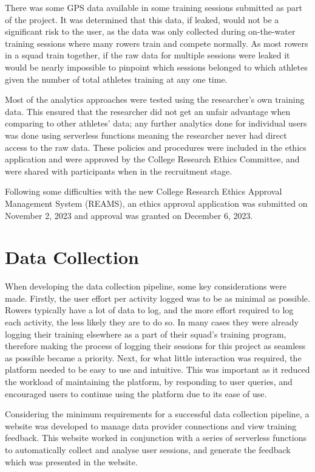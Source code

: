 There was some GPS data available in some training sessions submitted as part of the project. It was determined that this data, if leaked, would not be a significant risk to the user, as the data was only collected during on-the-water training sessions where many rowers train and compete normally. As most rowers in a squad train together, if the raw data for multiple sessions were leaked it would be nearly impossible to pinpoint which sessions belonged to which athletes given the number of total athletes training at any one time. 

Most of the analytics approaches were tested using the researcher's own training data. This ensured that the researcher did not get an unfair advantage when comparing to other athletes' data; any further analytics done for individual users was done using serverless functions meaning the researcher never had direct access to the raw data. These policies and procedures were included in the ethics application and were approved by the College Research Ethics Committee, and were shared with participants when in the recruitment stage. 

Following some difficulties with the new College Research Ethics Approval Management System (REAMS), an ethics approval application was submitted on November 2, 2023 and approval was granted on December 6, 2023.

\section{Data Collection}
When developing the data collection pipeline, some key considerations were made. Firstly, the user effort per activity logged was to be as minimal as possible. Rowers typically have a lot of data to log, and the more effort required to log each activity, the less likely they are to do so. In many cases they were already logging their training elsewhere as a part of their squad's training program, therefore making the process of logging their sessions for this project as seamless as possible became a priority. Next, for what little interaction was required, the platform needed to be easy to use and intuitive. This was important as it reduced the workload of maintaining the platform, by responding to user queries, and encouraged users to continue using the platform due to its ease of use.

Considering the minimum requirements for a successful data collection pipeline, a website was developed to manage data provider connections and view training feedback. This website worked in conjunction with a series of serverless functions to automatically collect and analyse user sessions, and generate the feedback which was presented in the website.


